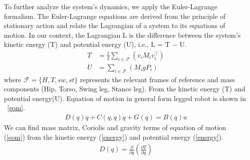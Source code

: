 \documentclass[letterpaper, 10 pt, conference]{ieeeconf}  %
\begin{document}
To further analyze the system's dynamics, we apply the Euler-Lagrange formalism. The Euler-Lagrange equations are derived from the principle of stationary action and relate the Lagrangian of a system to its equations of motion. In our context, the Lagrangian L is the difference between the system's kinetic energy (T) and potential energy (U), i.e., L = T $-$ U.
%
\begin{equation}
\begin{aligned}
    T &= \tfrac{1}{2}\sum_{i \in \mathcal{F}} \left( v_iM_iv_i^{\top} \right) \\
    U &= \sum_{i \in \mathcal{F}} \left( M_igP_{i} \right)
\end{aligned}
\label{energy}
\end{equation}
%
where $\mathcal{F} = \{H,T,sw,st\}$ represents the relevant frames of reference and mass components (Hip, Torso, Swing leg, Stance leg). From the kinetic energy (T) and potential energy(U). Equation of motion in general form legged robot is shown in ~\ref{eom}. 
%
\begin{equation}
\begin{aligned}
    D(q)\ddot{q} + C(q,\dot{q})\dot{q} + G(q) = B(q)u
\end{aligned}
\label{eom}
\end{equation}
%
We can find mass matrix, Coriolis and gravity terms of equation of motion (\ref{eom}) from the kinetic energy (\ref{energy}) and potential energy (\ref{energy}).
%
\begin{equation}
\begin{aligned}
    D(q) = \frac{\partial}{\partial q}\left( \frac{\partial T}{\partial q}\right) 
\end{aligned}
\label{mass matrix}
\end{equation}
%
\end{document}
